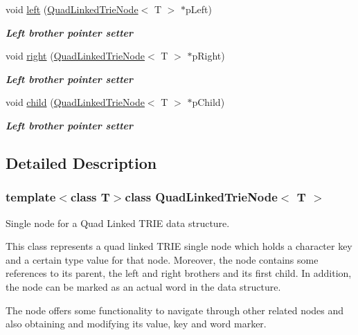 \begin{DoxyCompactItemize}
void \hyperlink{classQuadLinkedTrieNode_a9c62cb270b607e09e0bd98242a67c2b5}{left} (\hyperlink{classQuadLinkedTrieNode}{Quad\-Linked\-Trie\-Node}$<$ T $>$ $\ast$p\-Left)
\begin{DoxyCompactList}\small\item\em {\bfseries Left brother pointer setter} \end{DoxyCompactList}\item 
void \hyperlink{classQuadLinkedTrieNode_ac068294f42337015dde5695d053869c7}{right} (\hyperlink{classQuadLinkedTrieNode}{Quad\-Linked\-Trie\-Node}$<$ T $>$ $\ast$p\-Right)
\begin{DoxyCompactList}\small\item\em {\bfseries Left brother pointer setter} \end{DoxyCompactList}\item 
void \hyperlink{classQuadLinkedTrieNode_add46f502e721f5cc00a3972d6cbec709}{child} (\hyperlink{classQuadLinkedTrieNode}{Quad\-Linked\-Trie\-Node}$<$ T $>$ $\ast$p\-Child)
\begin{DoxyCompactList}\small\item\em {\bfseries Left brother pointer setter} \end{DoxyCompactList}\end{DoxyCompactItemize}


\subsection{Detailed Description}
\subsubsection*{template$<$class T$>$class Quad\-Linked\-Trie\-Node$<$ T $>$}

Single node for a Quad Linked T\-R\-I\-E data structure. 

This class represents a quad linked T\-R\-I\-E single node which holds a character key and a certain type value for that node. Moreover, the node contains some references to its parent, the left and right brothers and its first child. In addition, the node can be marked as an actual word in the data structure.

The node offers some functionality to navigate through other related nodes and also obtaining and modifying its value, key and word marker. 

